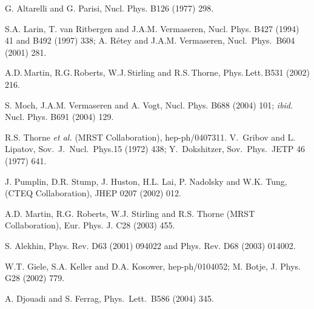 \begin{thebibliography}{999}
 G. Altarelli and G. Parisi, Nucl. Phys. B126 (1977) 298.  

  S.A. Larin, T. van Ritbergen and J.A.M. Vermaseren, Nucl.
Phys. B427 (1994) 41 and B492 (1997) 338; A. R\'etey and J.A.M. Vermaseren, 
Nucl.~Phys.~B604 (2001) 281.

A.D.\,Martin, R.G.\,Roberts, W.J.\,Stirling and R.S.\,Thorne,
Phys.\,Lett.\,B531 (2002) 216. 

 S. Moch, J.A.M. Vermaseren and A. Vogt, Nucl. Phys. B688 
(2004) 101; {\it ibid.} Nucl. Phys. B691 (2004) 129. 

 R.S. Thorne {\it et al.} (MRST Collaboration), 
hep-ph/0407311.
V.\, Gribov and L.\, Lipatov, Sov.\, J.\, Nucl.\, Phys.15 (1972) 438; 
Y.\, Dokshitzer, Sov.\, Phys.\, JETP 46 (1977) 641.

 J. Pumplin, D.R. Stump, J. Huston, H.L.
Lai, P. Nadolsky and W.K. Tung, (CTEQ Collaboration), JHEP 0207 (2002) 012. 

 A.D. Martin, R.G. Roberts, W.J. Stirling  and R.S. Thorne
(MRST Collaboration), Eur. Phys. J. C28 (2003) 455. 

 S. Alekhin, Phys. Rev. D63 (2001) 094022 and 
Phys. Rev. D68 (2003) 014002. 

 W.T. Giele, S.A. Keller and D.A. Kosower, hep-ph/0104052;
M. Botje, J. Phys. G28 (2002) 779. 

 A. Djouadi and S. Ferrag,  Phys.\, Lett.\, B586 (2004) 345.


\end{thebibliography}
